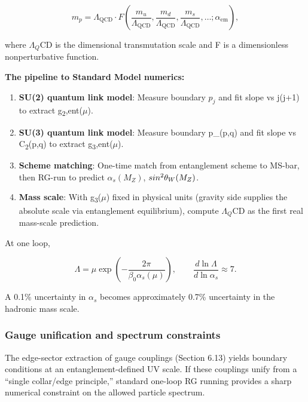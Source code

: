 \documentclass[11pt,a4paper]{article}
\theoremstyle{remark}
\begin{document}
\[
m_p = \Lambda_{\mathrm{QCD}} \cdot F\left(\frac{m_u}{\Lambda_{\mathrm{QCD}}},
\frac{m_d}{\Lambda_{\mathrm{QCD}}}, \frac{m_s}{\Lambda_{\mathrm{QCD}}}, \ldots;
\alpha_{\mathrm{em}}\right),
\]

where \(\ensuremath{\Lambda}_Q\)CD is the dimensional transmutation scale and F is a
dimensionless nonperturbative function.

\textbf{The pipeline to Standard Model numerics:}

\begin{enumerate}
\def\labelenumi{\arabic{enumi}.}
\item
  \textbf{SU(2) quantum link model}: Measure boundary \(p_j\) and fit slope
  vs j(j+1) to extract g\textsubscript{2},ent(\ensuremath{\mu}).
\item
  \textbf{SU(3) quantum link model}: Measure boundary p\_(p,q) and fit
  slope vs C\textsubscript{2}(p,q) to extract g\textsubscript{3},ent(\ensuremath{\mu}).
\item
  \textbf{Scheme matching}: One-time match from entanglement scheme to
  MS-bar, then RG-run to predict \(\ensuremath{\alpha}_s(M_Z)\), \(sin\textsuperscript{2}\ensuremath{\theta}_W(M_Z)\).
\item
  \textbf{Mass scale}: With g\textsubscript{3}(\ensuremath{\mu}) fixed in physical units (gravity side
  supplies the absolute scale via entanglement equilibrium), compute
  \(\ensuremath{\Lambda}_Q\)CD as the first real mass-scale prediction.
\end{enumerate}

At one loop,

\[
\Lambda = \mu \exp\left(-\frac{2\pi}{\beta_0 \alpha_s(\mu)}\right),
\qquad
\frac{d \ln \Lambda}{d \ln \alpha_s} \approx 7.
\]

A 0.1\% uncertainty in \(\ensuremath{\alpha}_s\) becomes approximately 0.7\% uncertainty in the
hadronic mass scale.

\subsubsection{Gauge unification and spectrum constraints}\label{gauge-unification-and-spectrum-constraints}

The edge-sector extraction of gauge couplings (Section 6.13) yields boundary
conditions at an entanglement-defined UV scale. If these couplings unify from a
``single collar/edge principle,'' standard one-loop RG running provides a sharp
numerical constraint on the allowed particle spectrum.
\end{document}

